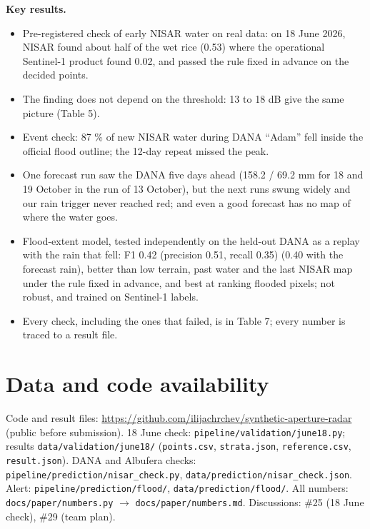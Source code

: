 \documentclass[10pt,twocolumn]{article}
\begin{document}
\textbf{Key results.}

\begin{itemize}
\item{} Pre-registered check of early NISAR water on real data: on 18 June 2026, NISAR found about half of the wet rice (0.53) where the operational Sentinel-1 product found 0.02, and passed the rule fixed in advance on the decided points.
\item{} The finding does not depend on the threshold: \textminus{}13 to \textminus{}18 dB give the same picture (Table 5).
\item{} Event check: 87 \% of new NISAR water during DANA ``Adam'' fell inside the official flood outline; the 12-day repeat missed the peak.
\item{} One forecast run saw the DANA five days ahead (158.2 / 69.2 mm for 18 and 19 October in the run of 13 October), but the next runs swung widely and our rain trigger never reached red; and even a good forecast has no map of where the water goes.
\item{} Flood-extent model, tested independently on the held-out DANA as a replay with the rain that fell: F1 0.42 (precision 0.51, recall 0.35) (0.40 with the forecast rain), better than low terrain, past water and the last NISAR map under the rule fixed in advance, and best at ranking flooded pixels; not robust, and trained on Sentinel-1 labels.
\item{} Every check, including the ones that failed, is in Table 7; every number is traced to a result file.
\end{itemize}
\section*{Data and code availability}
Code and result files: \url{https://github.com/ilijachrchev/synthetic-aperture-radar} (public before submission). 18 June check: \texttt{pipeline/\allowbreak{}validation/\allowbreak{}june18.\allowbreak{}py}; results \texttt{data/\allowbreak{}validation/\allowbreak{}june18/\allowbreak{}} (\texttt{points.\allowbreak{}csv}, \texttt{strata.\allowbreak{}json}, \texttt{reference.\allowbreak{}csv}, \texttt{result.\allowbreak{}json}). DANA and Albufera checks: \texttt{pipeline/\allowbreak{}prediction/\allowbreak{}nisar\_\allowbreak{}check.\allowbreak{}py}, \texttt{data/\allowbreak{}prediction/\allowbreak{}nisar\_\allowbreak{}check.\allowbreak{}json}. Alert: \texttt{pipeline/\allowbreak{}prediction/\allowbreak{}flood/\allowbreak{}}, \texttt{data/\allowbreak{}prediction/\allowbreak{}flood/\allowbreak{}}. All numbers: \texttt{docs/\allowbreak{}paper/\allowbreak{}numbers.\allowbreak{}py} $\rightarrow$ \texttt{docs/\allowbreak{}paper/\allowbreak{}numbers.\allowbreak{}md}. Discussions: \#25 (18 June check), \#29 (team plan).
\end{document}

